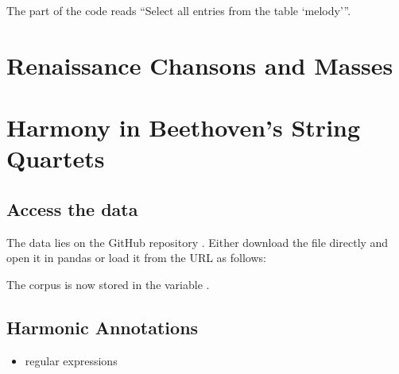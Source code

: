 \documentclass[letterpaper,10pt,english]{sphinxmanual}
\begin{document}
The part of the code  reads “Select all entries from the table ‘melody’”.


\chapter{Renaissance Chansons and Masses}
\label{\detokenize{renaissance:renaissance-chansons-and-masses}}\label{\detokenize{renaissance::doc}}


\chapter{Harmony in Beethoven’s String Quartets}
\label{\detokenize{beethoven_harmony:harmony-in-beethoven-s-string-quartets}}\label{\detokenize{beethoven_harmony::doc}}

\section{Access the data}
\label{\detokenize{beethoven_harmony:access-the-data}}
The data lies on the GitHub repository .
Either download the  file directly and open it in pandas or load it from the URL as follows:

\begin{sphinxVerbatim}[commandchars=\\\{\}]
   

   
\end{sphinxVerbatim}

The corpus is now stored in the variable .


\section{Harmonic Annotations}
\label{\detokenize{beethoven_harmony:harmonic-annotations}}\begin{itemize}
\item {} 
regular expressions

\end{itemize}
\end{document}
